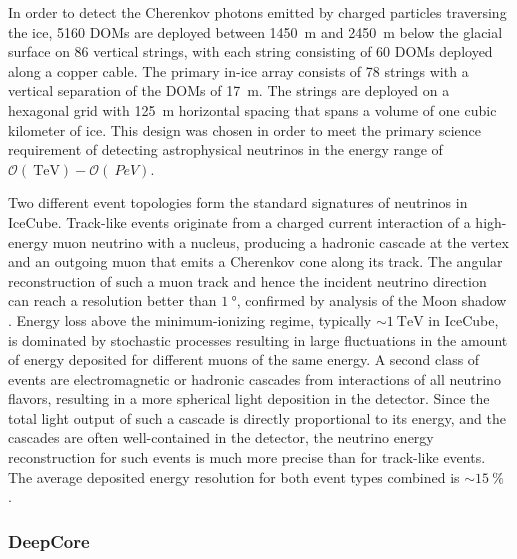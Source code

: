 In order to detect the Cherenkov photons emitted by charged particles
traversing the ice, \num{5160} DOMs are deployed between \SI{1450}{\meter}
and \SI{2450} {\meter} below the glacial surface on \num{86} vertical
strings, with each string consisting of \num{60} DOMs deployed along a copper cable. The
primary in-ice array consists of \num{78} strings with a vertical
separation of the DOMs of \SI{17}{\meter}.  The strings are
deployed on a hexagonal grid with \SI{125}{\meter} horizontal spacing that
spans a volume of one cubic kilometer of ice.  This design was chosen in
order to meet the primary science requirement of detecting astrophysical
neutrinos in the energy range of $\mathcal{O}(\SI{}{\tera\electronvolt}) -
\mathcal{O}(\SI{}{PeV})$.  %

Two different event topologies form the standard signatures of neutrinos in
IceCube.  Track-like events originate from a charged current interaction of
a high-energy muon neutrino with a nucleus, producing a hadronic cascade at
the vertex and an outgoing muon that emits a Cherenkov cone along its
track.  The angular reconstruction of such a muon track and hence the
incident neutrino direction can reach a resolution better than
$\SI{1}{\degree}$, confirmed by analysis of the Moon shadow
\cite{IC3:moon}. Energy loss above the minimum-ionizing regime, typically $ \sim
\SI{1}{\tera\electronvolt}$ in IceCube, is dominated by stochastic
processes resulting in large fluctuations in the amount of energy deposited
for different muons of the same energy.  A second class of events are
electromagnetic or hadronic cascades from interactions of all neutrino
flavors, resulting in a more spherical light deposition in the detector.
Since the total light output of such a cascade is directly proportional to its energy, and
the cascades are often well-contained in the detector, the neutrino energy
reconstruction for such events is much more precise than for track-like
events. The average deposited energy resolution for both event types
combined is $ \sim \SI{15}{\%}$ \cite{IC3:ereco}.

\subsubsection{DeepCore}

